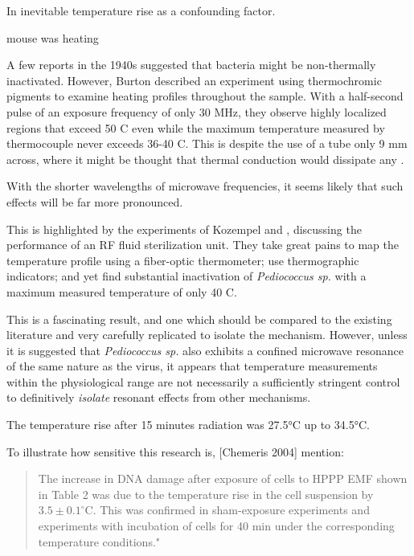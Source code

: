 \documentclass[paper.tex]{subfiles}
\begin{document}
\begin{multicols}{1}
In inevitable temperature rise as a confounding factor. 

mouse was heating

A few reports in the 1940s suggested that bacteria might be non-thermally inactivated. However, Burton\cite{Effects1950} described an experiment using thermochromic pigments to examine heating profiles throughout the sample. With a half-second pulse of an exposure frequency of only 30 MHz, they observe highly localized regions that exceed 50 C even while the maximum temperature measured by thermocouple never exceeds 36-40 C. This is despite the use of a tube only 9 mm across, where it might be thought that thermal conduction would dissipate any . 

With the shorter wavelengths of microwave frequencies, it seems likely that such effects will be far more pronounced.

This is highlighted by the experiments of Kozempel \cite{Preliminary1997} and \cite{Inactivationa}, discussing the performance of an RF fluid sterilization unit. They take great pains to map the temperature profile using a fiber-optic thermometer; use thermographic indicators; and yet find substantial inactivation of {\it Pediococcus sp.} with a maximum measured temperature of only 40 C.

This is a fascinating result, and one which should be compared to the existing literature and very carefully replicated to isolate the mechanism. However, unless it is suggested that {\it Pediococcus sp.} also exhibits a confined microwave resonance of the same nature as the virus, it appears that temperature measurements within the physiological range are not necessarily a sufficiently stringent control to definitively {\it isolate} resonant effects from other mechanisms.


The temperature rise after 15 minutes radiation was 27.5°C up to 34.5°C.


To illustrate how sensitive this research is, [Chemeris 2004] mention:

\begin{quote}
	
	The increase in DNA damage after exposure of cells to HPPP EMF shown in Table 2 was due to the temperature rise in the cell suspension by $3.5\pm0.1^{\circ}  $C. This was confirmed in sham-exposure experiments and experiments with incubation of cells for 40 min under the corresponding temperature conditions."
	
\end{quote}


\end{multicols}
\end{document}
